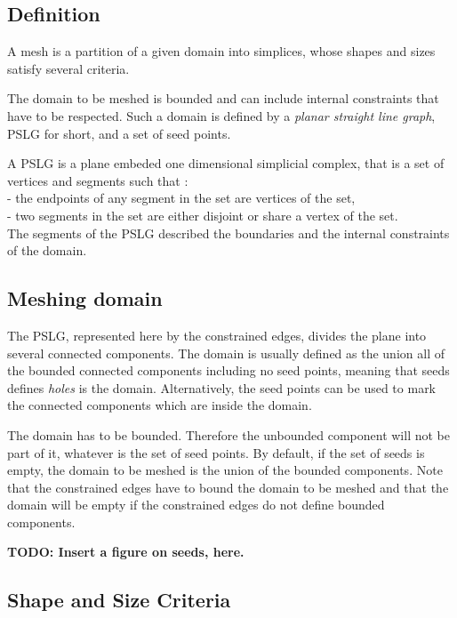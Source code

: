 \subsection{Definition}
\label{sec:Mesh_2_meshes_definition}

A mesh is a partition of a given domain into simplices, whose shapes
and sizes satisfy several criteria.

The domain to be meshed is bounded and can include internal constraints
that have to be respected.  Such a domain is defined by a \emph{planar
  straight line graph}, PSLG for short, and a set of seed points.

A PSLG is a plane embeded one dimensional simplicial complex, that
is a set of vertices and segments such that : \\
- the endpoints of any segment in the set are vertices of the set, \\
- two segments in the set are either disjoint or share a vertex of the 
set. \\
The segments of the PSLG described the boundaries and the internal
constraints of the domain.

\subsection{Meshing domain}
\label{sec:Mesh_2_meshin_domain}

The PSLG, represented here by the constrained edges, divides the plane into several connected components.  The domain
is usually defined as the union all of the bounded connected components
including no seed points, meaning that seeds defines \emph{holes} is the
domain.  Alternatively, the seed points can be used to mark the connected
components which are inside the domain.

The domain has to be bounded. Therefore the unbounded component will not be
part of it, whatever is the set of seed points. By default, if the set of
seeds is empty, the domain to be meshed is the union of the bounded
components. Note that the constrained edges have to bound the domain to be
meshed and that the domain will be empty if the constrained edges do not
define bounded components.

\textbf{TODO: Insert a figure on seeds, here.}

\subsection{Shape and Size Criteria}
\label{sec:Mesh_2_criteria}

